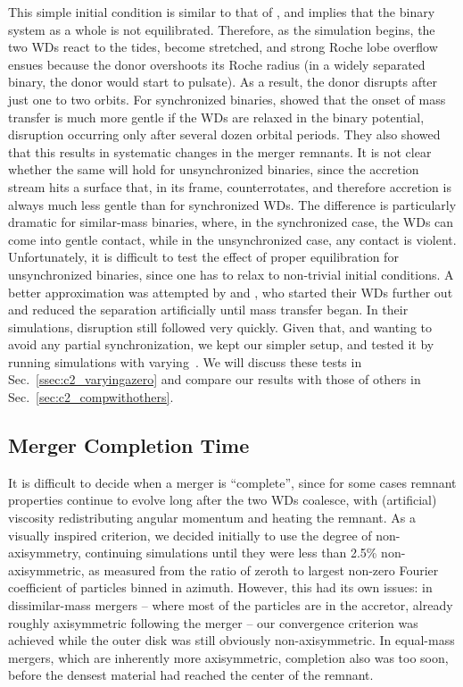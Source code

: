 This simple initial condition is similar to that of \cite{pakm+10}, and implies that the binary system as a whole is not equilibrated.  Therefore, as the simulation begins, the two WDs react to the tides, become stretched, and strong Roche lobe overflow ensues because the donor overshoots its Roche radius (in a widely separated binary, the donor would start to pulsate).  As a result, the donor disrupts after just one to two orbits.  For synchronized binaries, \cite{dan+11} showed that the onset of mass transfer is much more gentle if the WDs are relaxed in the binary potential, disruption occurring only after several dozen orbital periods.  They also showed that this results in systematic changes in the merger remnants.  It is not clear whether the same will hold for unsynchronized binaries, since the accretion stream hits a surface that, in its frame, counterrotates, and therefore accretion is always much less gentle than for synchronized WDs.  The difference is particularly dramatic for similar-mass binaries, where, in the synchronized case, the WDs can come into gentle contact, while in the unsynchronized case, any contact is violent.  Unfortunately, it is difficult to test the effect of proper equilibration for unsynchronized binaries, since one has to relax to non-trivial initial conditions.  A better approximation was attempted by \citeal{loreig09} and \cite{guerig04}, who started their WDs further out and reduced the separation artificially until mass transfer began.  In their simulations, disruption still followed very quickly.  Given that, and wanting to avoid any partial synchronization, we kept our simpler setup, and tested it by running simulations with varying~{\azero}.  We will discuss these tests in Sec.~\ref{ssec:c2_varyingazero} and compare our results with those of others in Sec.~\ref{sec:c2_compwithothers}.

\subsection{Merger Completion Time}
\label{ssec:c2_mergercomplete}

It is difficult to decide when a merger is ``complete'', since for some cases remnant properties continue to evolve long after the two WDs coalesce, with (artificial) viscosity redistributing angular momentum and heating the remnant.  As a visually inspired criterion, we decided initially to use the degree of non-axisymmetry, continuing simulations until they were less than 2.5\% non-axisymmetric, as measured from the ratio of zeroth to largest non-zero Fourier coefficient of particles binned in azimuth.  However, this had its own issues: in dissimilar-mass mergers --  where most of the particles are in the accretor, already roughly axisymmetric following the merger -- our convergence criterion was achieved while the outer disk was still obviously non-axisymmetric.  In equal-mass mergers, which are inherently more axisymmetric, completion also was too soon, before the densest material had reached the center of the remnant.

